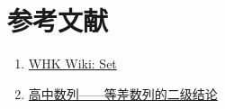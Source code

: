 \section{参考文献}

\begin{enumerate}
    \item \href{https://whk-wiki.github.io/whk-wiki/set}{WHK Wiki: Set}
    \item \href{https://zhuanlan.zhihu.com/p/412317685}{高中数列——等差数列的二级结论}
\end{enumerate}